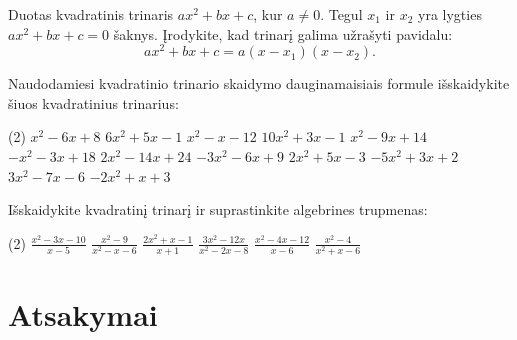 \documentclass[11pt,a4paper]{scrartcl}
\begin{document}
\begin{problem}
Duotas kvadratinis trinaris $ax^2+bx+c$, kur $a\ne 0$. Tegul $x_1$ ir $x_2$ yra lygties $ax^2+bx+c=0$ šaknys. Įrodykite, kad trinarį galima užrašyti pavidalu:
\[
ax^2+bx+c=a(x-x_1)(x-x_2).
\]
\end{problem}

\begin{problem}
Naudodamiesi kvadratinio trinario skaidymo dauginamaisiais formule išskaidykite šiuos kvadratinius trinarius:
\begin{tasks}[label={(\arabic*)}, label-offset=0.9em](2)
    \task $x^2 - 6x + 8$
    \task $6x^2 + 5x - 1$
    \task $x^2 - x - 12$
    \task $10x^2 + 3x -1$
    \task $x^2 - 9x + 14$
    \task $-x^2 -3x +18$
    \task $2x^2 - 14x + 24$
    \task $-3x^2 - 6x + 9$
    \task $2x^2 + 5x - 3$
    \task $-5x^2 + 3x + 2$
    \task $3x^2 - 7x - 6$
    \task $-2x^2 + x + 3$
\end{tasks}
\end{problem}

\begin{problem}
Išskaidykite kvadratinį trinarį ir suprastinkite algebrines trupmenas:
\begin{tasks}[label={(\arabic*)}, label-offset=0.9em](2)
    \task $\frac{x^2 - 3x - 10}{x - 5}$
    \task $\frac{x^2 - 9}{x^2 - x - 6}$
    \task $\frac{2x^2 + x - 1}{x + 1}$
    \task $\frac{3x^2 - 12x}{x^2 - 2x - 8}$
    \task $\frac{x^2 - 4x - 12}{x - 6}$
    \task $\frac{x^2 - 4}{x^2 + x - 6}$
\end{tasks}
\end{problem}

\newpage
\section{Atsakymai}
\end{document}
